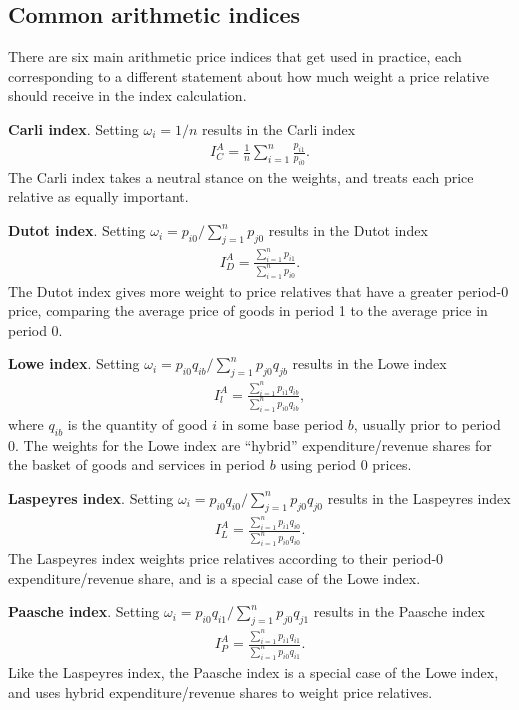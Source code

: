 \documentclass[
]{article}
\begin{document}
\hypertarget{common-arithmetic-indices}{%
\subsection{Common arithmetic indices}\label{common-arithmetic-indices}}

There are six main arithmetic price indices that get used in practice, each corresponding to a different statement about how much weight a price relative should receive in the index calculation.

\textbf{Carli index}. Setting \(\omega_{i} = 1 / n\) results in the Carli index
\begin{align*}
I^{A}_{C} = \frac{1}{n} \sum_{i = 1}^{n} \frac{p_{i1}}{p_{i0}}.
\end{align*}
The Carli index takes a neutral stance on the weights, and treats each price relative as equally important.

\textbf{Dutot index}. Setting \(\omega_{i} = p_{i0} / \sum_{j = 1}^{n} p_{j0}\) results in the Dutot index
\begin{align*}
I^{A}_D = \frac{\sum_{i = 1}^{n} p_{i1}}{\sum_{i = 1}^{n} p_{i0}}.
\end{align*}
The Dutot index gives more weight to price relatives that have a greater period-0 price, comparing the average price of goods in period 1 to the average price in period 0.

\textbf{Lowe index}. Setting \(\omega_{i} = p_{i0} q_{ib} / \sum_{j = 1}^{n} p_{j0} q_{jb}\) results in the Lowe index
\begin{align*}
I^{A}_{l} = \frac{\sum_{i = 1}^{n} p_{i1} q_{ib}}{\sum_{i = 1}^{n} p_{i0} q_{ib}},
\end{align*}
where \(q_{ib}\) is the quantity of good \(i\) in some base period \(b\), usually prior to period 0. The weights for the Lowe index are ``hybrid'' expenditure/revenue shares for the basket of goods and services in period \(b\) using period 0 prices.

\textbf{Laspeyres index}. Setting \(\omega_{i} = p_{i0} q_{i0} / \sum_{j = 1}^{n} p_{j0} q_{j0}\) results in the Laspeyres index
\begin{align*}
I^{A}_{L} = \frac{\sum_{i = 1}^{n} p_{i1} q_{i0}}{\sum_{i = 1}^{n} p_{i0} q_{i0}}.
\end{align*}
The Laspeyres index weights price relatives according to their period-0 expenditure/revenue share, and is a special case of the Lowe index.

\textbf{Paasche index}. Setting \(\omega_{i} = p_{i0} q_{i1} / \sum_{j = 1}^{n} p_{j0} q_{j1}\) results in the Paasche index
\begin{align*}
I^{A}_{P} = \frac{\sum_{i = 1}^{n} p_{i1} q_{i1}}{\sum_{i = 1}^{n} p_{i0} q_{i1}}.
\end{align*}
Like the Laspeyres index, the Paasche index is a special case of the Lowe index, and uses hybrid expenditure/revenue shares to weight price relatives.
\end{document}
